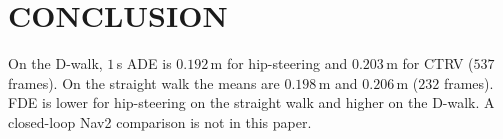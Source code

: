 \documentclass[letterpaper, 10pt, conference]{IEEEtran}
\begin{document}
\section{CONCLUSION}

On the D-walk, $1$\,s ADE is $0.192$\,m for hip-steering and $0.203$\,m
for CTRV ($537$ frames). On the straight walk the means are $0.198$\,m
and $0.206$\,m ($232$ frames). FDE is lower for hip-steering on the
straight walk and higher on the D-walk. A closed-loop Nav2 comparison is
not in this paper.



\end{document}
